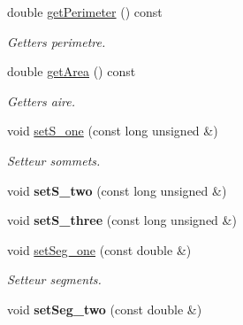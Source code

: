 \begin{DoxyCompactItemize}
\item 
\hypertarget{class_face_acd3e36c17c14b6617d92b0b9ecb2b6fc}{double \hyperlink{class_face_acd3e36c17c14b6617d92b0b9ecb2b6fc}{get\-Perimeter} () const }\label{class_face_acd3e36c17c14b6617d92b0b9ecb2b6fc}

\begin{DoxyCompactList}\small\item\em Getters perimetre. \end{DoxyCompactList}\item 
\hypertarget{class_face_a58beb8ce1b9f8154379db998a02ffa3d}{double \hyperlink{class_face_a58beb8ce1b9f8154379db998a02ffa3d}{get\-Area} () const }\label{class_face_a58beb8ce1b9f8154379db998a02ffa3d}

\begin{DoxyCompactList}\small\item\em Getters aire. \end{DoxyCompactList}\item 
\hypertarget{class_face_acb89a29860fd07bb415a52ec9a2fe695}{void \hyperlink{class_face_acb89a29860fd07bb415a52ec9a2fe695}{set\-S\-\_\-one} (const long unsigned \&)}\label{class_face_acb89a29860fd07bb415a52ec9a2fe695}

\begin{DoxyCompactList}\small\item\em Setteur sommets. \end{DoxyCompactList}\item 
\hypertarget{class_face_a8cd35d467fbfc7d88f415884221b38d4}{void {\bfseries set\-S\-\_\-two} (const long unsigned \&)}\label{class_face_a8cd35d467fbfc7d88f415884221b38d4}

\item 
\hypertarget{class_face_ac362a97171117e0ab8f7b0b1506569c2}{void {\bfseries set\-S\-\_\-three} (const long unsigned \&)}\label{class_face_ac362a97171117e0ab8f7b0b1506569c2}

\item 
\hypertarget{class_face_a6c888b3f4933cc7c9b5ab80c50be90c9}{void \hyperlink{class_face_a6c888b3f4933cc7c9b5ab80c50be90c9}{set\-Seg\-\_\-one} (const double \&)}\label{class_face_a6c888b3f4933cc7c9b5ab80c50be90c9}

\begin{DoxyCompactList}\small\item\em Setteur segments. \end{DoxyCompactList}\item 
\hypertarget{class_face_a92f7231d63697ec23256996bd0616914}{void {\bfseries set\-Seg\-\_\-two} (const double \&)}\label{class_face_a92f7231d63697ec23256996bd0616914}


\end{DoxyCompactItemize}

